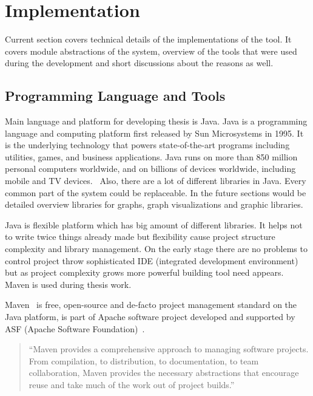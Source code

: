 \section{Implementation}
\label{sec:implementation}

Current section covers technical details of the implementations of the tool. It covers module abstractions of the system, overview of the tools that were used during the development and
short discussions about the reasons as well.

\subsection{Programming Language and Tools}

Main language and platform for developing thesis is Java. Java is a programming language and computing
platform first released by Sun Microsystems in 1995. It is the underlying technology that powers state-of-the-art
programs including utilities, games, and business applications. Java runs on more than 850 million personal computers worldwide,
and on billions of devices worldwide, including mobile and TV devices.~\cite{java_com}
Also, there are a lot of different libraries in Java. Every common part of the system could be replaceable.
In the future sections would be detailed overview libraries for graphs, graph visualizations and graphic libraries.


Java is flexible platform which has big amount of different libraries. It helps not to write twice things already made but flexibility cause project structure complexity and library management. On the early stage there are no problems to control project throw sophisticated IDE (integrated development environment) but as project complexity grows more powerful building tool need appears. Maven is used during thesis work.


Maven~\cite{MAVEN_HOME_PAGE} is free, open-source and de-facto project management standard on the Java platform,
is part of Apache software project developed and supported by ASF (Apache Software Foundation)~\cite{APACHE_FOUNDATION_HOME_PAGE}.

\begin{quotation}
``Maven provides a comprehensive approach to managing software projects.
From compilation, to distribution, to documentation, to team collaboration,
Maven provides the necessary abstractions that encourage reuse and take much of the work out of project builds.''~\cite{MAVEN_BOOK_1}
\end{quotation}

